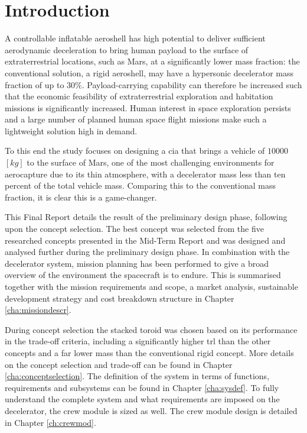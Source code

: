 \section{Introduction}
\label{cha:introduction}

A controllable inflatable aeroshell has high potential to deliver sufficient aerodynamic deceleration to bring human payload to the surface of extraterrestrial locations, such as Mars, at a significantly lower mass fraction: the conventional solution, a rigid aeroshell, may have a hypersonic decelerator mass fraction of up to $30\%$. Payload-carrying capability can therefore be increased such that the economic feasibility of extraterrestrial exploration and habitation missions is significantly increased. Human interest in space exploration persists and a large number of planned human space flight missions make such a lightweight solution high in demand. 

To this end the study focuses on designing a \acrfull{cia} that brings a vehicle of $10000$ $[kg]$ to the surface of Mars, one of the most challenging environments for aerocapture due to its thin atmosphere, with a decelerator mass less than ten percent of the total vehicle mass. Comparing this to the conventional mass fraction, it is clear this is a game-changer.

This Final Report details the result of the preliminary design phase, following upon the concept selection. The best concept was selected from the five researched concepts presented in the Mid-Term Report and was designed and analysed further during the preliminary design phase. In combination with the decelerator system, mission planning has been performed to give a broad overview of the environment the spacecraft is to endure. This is summarised together with the mission requirements and scope, a market analysis, sustainable development strategy and cost breakdown structure in Chapter \ref{cha:missiondescr}.

During concept selection the stacked toroid was chosen based on its performance in the trade-off criteria, including a significantly higher \gls{trl} than the other concepts and a far lower mass than the conventional rigid concept. More details on the concept selection and trade-off can be found in Chapter \ref{cha:conceptselection}. The definition of the system in terms of functions, requirements and subsystems can be found in Chapter \ref{cha:sysdef}. To fully understand the complete system and what requirements are imposed on the decelerator, the crew module is sized as well. The crew module design is detailed in Chapter \ref{ch:crewmod}.

